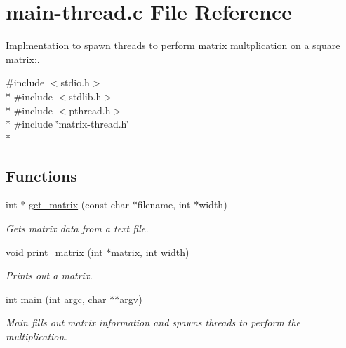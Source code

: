 \hypertarget{main-thread_8c}{\section{main-\/thread.c File Reference}
\label{main-thread_8c}
}


Implmentation to spawn threads to perform matrix multplication on a square matrix;.  


{\ttfamily \#include $<$stdio.\-h$>$}\\*
{\ttfamily \#include $<$stdlib.\-h$>$}\\*
{\ttfamily \#include $<$pthread.\-h$>$}\\*
{\ttfamily \#include \char`\"{}matrix-\/thread.\-h\char`\"{}}\\*
\subsection*{Functions}
\begin{DoxyCompactItemize}
\item 
int $\ast$ \hyperlink{main-thread_8c_a2dcbc9f37a8a160f754c9799f5e505bd}{get\-\_\-matrix} (const char $\ast$filename, int $\ast$width)
\begin{DoxyCompactList}\small\item\em Gets matrix data from a text file. \end{DoxyCompactList}\item 
void \hyperlink{main-thread_8c_a62514f596204ff609ea148da4b58293a}{print\-\_\-matrix} (int $\ast$matrix, int width)
\begin{DoxyCompactList}\small\item\em Prints out a matrix. \end{DoxyCompactList}\item 
int \hyperlink{main-thread_8c_a3c04138a5bfe5d72780bb7e82a18e627}{main} (int argc, char $\ast$$\ast$argv)
\begin{DoxyCompactList}\small\item\em Main fills out matrix information and spawns threads to perform the multiplication. \end{DoxyCompactList}\end{DoxyCompactItemize}


